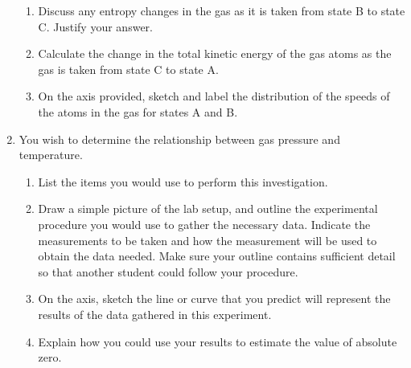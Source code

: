 \documentclass{../../oss-apphys}
\begin{document}
\begin{enumerate}[leftmargin=15pt]
\begin{enumerate}[leftmargin=18pt]
  \item Discuss any entropy changes in the gas as it is taken from state B
    to state C. Justify your answer.
    \vspace{1in}
  \item Calculate the change in the total kinetic energy of the gas atoms
    as the gas is taken from state C to state A.
    \vspace{1in}
  \item On the axis provided, sketch and label the distribution of the speeds
    of the atoms in the gas for states A and B.
    \begin{center}
    \end{center}
  \end{enumerate}

\item You wish to determine the relationship between gas pressure and
  temperature.
  \begin{enumerate}[leftmargin=18pt]
  \item List the items you would use to perform this investigation.
    \newpage
    
  \item Draw a simple picture of the lab setup, and outline the experimental
    procedure you would use to gather the necessary data. Indicate the
    measurements to be taken and how the measurement will be used to obtain the
    data needed. Make sure your outline contains sufficient detail so that
    another student could follow your procedure.
    \vspace{1.75in}
  \item On the axis, sketch the line or curve that you predict will represent
    the results of the data gathered in this experiment.
    \begin{center}
    \end{center}
    
  \item Explain how you could use your results to estimate the value of
    absolute zero.
  \end{enumerate}


\end{enumerate}
\end{document}
